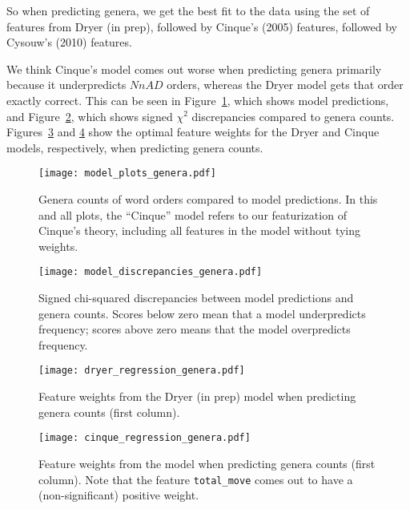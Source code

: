 \documentclass[11pt]{article}
\begin{document}
So when predicting genera, we get the best fit to the data using the set of features from Dryer (in prep), followed by Cinque's (2005) features, followed by Cysouw's (2010) features.

We think Cinque's model comes out worse when predicting genera primarily because it underpredicts $NnAD$ orders, whereas the Dryer model gets that order exactly correct. This can be seen in Figure~\ref{fig:genera-predictions}, which shows model predictions, and Figure~\ref{fig:genera-discrepancies}, which shows signed $\chi^2$ discrepancies compared to genera counts.
Figures~\ref{fig:dryer-model-genera} and \ref{fig:cinque-model-genera} show the optimal feature weights for the Dryer and Cinque models, respectively, when predicting genera counts.

\begin{figure}[ht!]
  \centering
  \texttt{[image: model\_plots\_genera.pdf]}
  \caption{Genera counts of word orders compared to model predictions. In this and all plots, the ``Cinque'' model refers to our featurization of Cinque's theory, including all features in the model without tying weights.}
  \label{fig:genera-predictions}
\end{figure}

\begin{figure}[ht!]
  \centering
  \texttt{[image: model\_discrepancies\_genera.pdf]}
  \caption{Signed chi-squared discrepancies between model predictions and genera counts. Scores below zero mean that a model underpredicts frequency; scores above zero means that the model overpredicts frequency.}
  \label{fig:genera-discrepancies}
\end{figure}

\begin{figure}[ht!]
  \centering
  \texttt{[image: dryer\_regression\_genera.pdf]}
  \caption{Feature weights from the Dryer (in prep) model when predicting genera counts (first column).}
  \label{fig:dryer-model-genera}
\end{figure}

\begin{figure}[ht!]
  \centering
  \texttt{[image: cinque\_regression\_genera.pdf]}
  \cprotect\caption{Feature weights from the \citet{cinque2005deriving} model when predicting genera counts (first column). Note that the feature \verb+total_move+ comes out to have a (non-significant) positive weight.}
  \label{fig:cinque-model-genera}
\end{figure}
\end{document}
